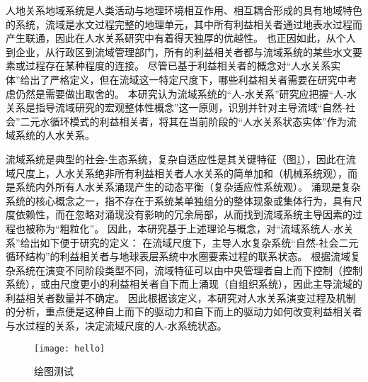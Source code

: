 
人地关系地域系统是人类活动与地理环境相互作用、相互耦合形成的具有地域特色的系统\cite{tan2021}，流域是水文过程完整的地理单元，其中所有利益相关者通过地表水过程而产生联通，因此在人水关系研究中有着得天独厚的优越性。
也正因如此，从个人到企业，从行政区到流域管理部门，所有的利益相关者都与流域系统的某些水文要素或过程存在某种程度的连接。
尽管已基于利益相关者的概念对“人水关系实体”给出了严格定义，但在流域这一特定尺度下，哪些利益相关者需要在研究中考虑仍然是需要做出取舍的。
本研究认为流域系统的“人-水关系”研究应把握“人-水关系是指导流域研究的宏观整体性概念”这一原则，识别并针对主导流域“自然-社会”二元水循环模式的利益相关者，将其在当前阶段的“人水关系状态实体”作为流域系统的人水关系。

流域系统是典型的社会-生态系统，复杂自适应性是其关键特征（图\ref{ch2:fig:complexity}），因此在流域尺度上，人水关系绝非所有利益相关者人水关系的简单加和（机械系统观），而是系统内外所有人水关系涌现产生的动态平衡（复杂适应性系统观）。
涌现是复杂系统的核心概念之一，指不存在于系统某单独组分的整体现象或集体行为，具有尺度依赖性，而在忽略对涌现没有影响的冗余局部，从而找到流域系统主导因素的过程也被称为“粗粒化”。
因此，本研究基于上述理论与概念，对“流域系统人-水关系”给出如下便于研究的定义：
在流域尺度下，主导人水复杂系统“自然-社会二元循环结构”的利益相关者与地球表层系统中水圈要素过程的联系状态。
根据流域复杂系统在演变不同阶段类型不同，流域特征可以由中央管理者自上而下控制（控制系统），或由尺度更小的利益相关者自下而上涌现（自组织系统），因此主导流域的利益相关者数量并不确定。
因此根据该定义，本研究对人水关系演变过程及机制的分析，重点便是这种自上而下的驱动力和自下而上的驱动力如何改变利益相关者与水过程的关系，决定流域尺度的人-水系统状态。

\begin{figure}[htb] %
    \texttt{[image: hello]}
    \caption[流域系统作为社会-生态系统的概念图式]{绘图测试}\label{ch2:fig:complexity}
\end{figure}
